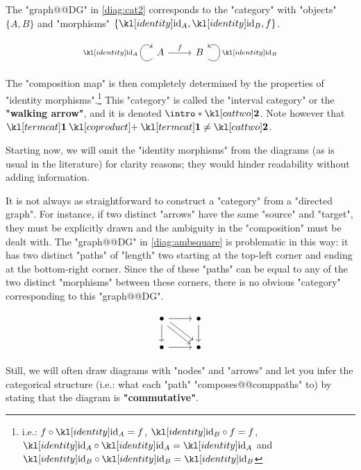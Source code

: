 \documentclass[main.tex]{subfiles}
\begin{document}
\begin{exmps}
	The "graph@@DG" in \eqref{diag:cat2} corresponds to the "category" with "objects" $\{A, B\}$ and "morphisms" $\{\id_A, \id_B, f\}$.
	\begin{equation}\label{diag:cat2}
		\begin{tikzcd}
			A \arrow[r, "f"] \arrow["\id_A", loop, distance=2em, in=145, out=215] & B \arrow["\id_B"', loop, distance=2em, in=35, out=325]
		\end{tikzcd}
	\end{equation}
	The "composition map" is then completely determined by the properties of "identity morphisms".\footnote{i.e.: $f \circ \id_A = f$, $\id_B \circ f = f$, $\id_A \circ \id_A = \id_A$ and $\id_B \circ \id_B = \id_B$} \AP This "category" is called the "interval category" or the \textbf{"walking arrow"}, and it is denoted $\intro*\cattwo$. Note however that $\termcat \coproduct \termcat \neq \cattwo$.
	
	Starting now, we will omit the "identity morphisms" from the diagrams (as is usual in the literature) for clarity reasons; they would hinder readability without adding information.
	
	It is not always as straightforward to construct a "category" from a "directed graph". For instance, if two distinct "arrows" have the same "source" and "target", they must be explicitly drawn and the ambiguity in the "composition" must be dealt with. The "graph@@DG" in \eqref{diag:ambsquare} is problematic in this way: it has two distinct "paths" of "length" two starting at the top-left corner and ending at the bottom-right corner. Since the  of these "paths" can be equal to any of the two distinct "morphisms" between these corners, there is no obvious "category" corresponding to this "graph@@DG".\begin{marginfigure}[-5\baselineskip]\begin{equation}\label{diag:ambsquare}\begin{tikzcd}
		\bullet \arrow[r] \arrow[d] \arrow[rd, shift left] \arrow[rd, shift right] & \bullet \arrow[d] \\
		\bullet \arrow[r]                                                          & \bullet          
		\end{tikzcd}\end{equation}\end{marginfigure}
	Still, we will often draw diagrams with "nodes" and "arrows" and let you infer the categorical structure (i.e.: what each "path" "composes@@comppaths" to) by stating that the diagram is \textbf{"commutative"}.
\end{exmps}
\end{document}
